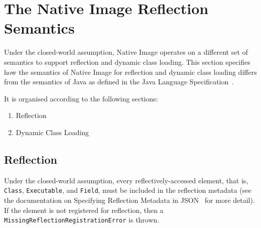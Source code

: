 
\chapter{The Native Image Reflection Semantics}\label{native_image_specs}
Under the closed-world assumption, Native Image operates on a different set of semantics to support reflection and dynamic class loading. This section specifies how the semantics of Native Image for reflection and dynamic class loading differs from the semantics of Java as defined in the Java Language Specification~\cite{noauthor_java_nodate-3}.

It is organised according to the following sections:
\begin{enumerate}
    \item Reflection
    \item Dynamic Class Loading
\end{enumerate}

\section{Reflection}
Under the closed-world assumption, every reflectively-accessed element, that is, \texttt{Class}, \texttt{Executable}, and \texttt{Field}, must be included in the reflection metadata (see the documentation on Specifying Reflection Metadata in JSON~\cite{noauthor_reachability_nodate} for more detail). If the element is not registered for reflection, then a \texttt{MissingReflectionRegistrationError} is thrown.


